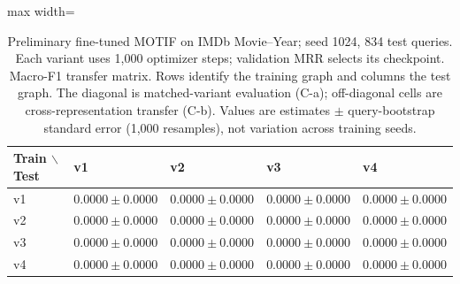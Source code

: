 \begin{table}[htbp]
\centering
\small
\renewcommand{\arraystretch}{1.15}
\setlength{\tabcolsep}{5pt}
\begin{adjustbox}{max width=\linewidth}
\begin{tabular}{|l|l|l|l|l|}
\hline
\textbf{Train $\backslash$ Test} & \textbf{v1} & \textbf{v2} & \textbf{v3} & \textbf{v4} \\
\hline
v1 & $0.0000 \pm 0.0000$ & $0.0000 \pm 0.0000$ & $0.0000 \pm 0.0000$ & $0.0000 \pm 0.0000$ \\
\hline
v2 & $0.0000 \pm 0.0000$ & $0.0000 \pm 0.0000$ & $0.0000 \pm 0.0000$ & $0.0000 \pm 0.0000$ \\
\hline
v3 & $0.0000 \pm 0.0000$ & $0.0000 \pm 0.0000$ & $0.0000 \pm 0.0000$ & $0.0000 \pm 0.0000$ \\
\hline
v4 & $0.0000 \pm 0.0000$ & $0.0000 \pm 0.0000$ & $0.0000 \pm 0.0000$ & $0.0000 \pm 0.0000$ \\
\hline
\end{tabular}
\end{adjustbox}
\caption{Preliminary fine-tuned MOTIF on IMDb Movie--Year; seed 1024, 834 test queries. Each variant uses 1,000 optimizer steps; validation MRR selects its checkpoint. Macro-F1 transfer matrix. Rows identify the training graph and columns the test graph. The diagonal is matched-variant evaluation (C-a); off-diagonal cells are cross-representation transfer (C-b). Values are estimates $\pm$ query-bootstrap standard error (1,000 resamples), not variation across training seeds.}
\label{tab:motif-imdb-movie-year-matrix-transfer-macro-f1}
\end{table}
